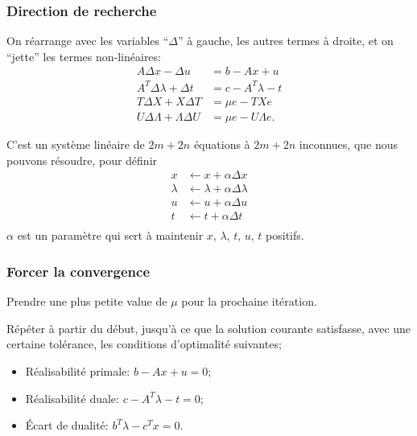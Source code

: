 \documentclass[t,usepdftitle=false]{beamer}
\begin{document}
\begin{frame}
\frametitle{Direction de recherche}

On réarrange avec les variables ``$\Delta$'' à gauche, les autres termes à droite, et on ``jette'' les termes non-linéaires:
\begin{align*}
A\Delta x - \Delta u &= b - Ax + u\\
A^T\Delta \lambda + \Delta t &= c - A^T\lambda - t \\
T\Delta X + X \Delta T &= \mu e - TXe \\
U\Delta \Lambda + \Lambda \Delta U  &= \mu e - U\Lambda e.
\end{align*}

\mbox{}

C'est un système linéaire de $2m + 2n$ équations à $2m + 2n$ inconnues, que nous pouvons résoudre, pour définir
\begin{align*}
x &\leftarrow x + \alpha \Delta x \\
\lambda &\leftarrow \lambda + \alpha \Delta \lambda \\
u &\leftarrow u + \alpha \Delta u \\
t &\leftarrow t + \alpha \Delta t \\
\end{align*}
$\alpha$ est un paramètre qui sert à maintenir $x$, $\lambda$, $t$, $u$, $t$ positifs.

\end{frame}

\begin{frame}
\frametitle{Forcer la convergence}

Prendre une plus petite value de $\mu$ pour la prochaine itération.

\mbox{}

Répéter à partir du début, jusqu'à ce que la solution courante satisfasse, avec une certaine tolérance, les conditions d'optimalité suivantes;
\begin{itemize}
\item
Réalisabilité primale: $b - Ax + u = 0$;
\item
Réalisabilité duale: $c - A^T\lambda - t = 0$;
\item
Écart de dualité: $b^T \lambda - c^Tx = 0$.
\end{itemize}

\mbox{}

\end{frame}
\end{document}
